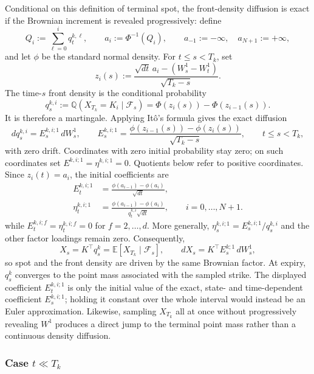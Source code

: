\documentclass[11pt]{article}
\newcommand{\Q}{\mathbb Q}
\theoremstyle{plain}
\theoremstyle{definition}
\theoremstyle{remark}
\begin{document}
Conditional on this definition of terminal spot, the front-density
diffusion is exact if the Brownian increment is revealed progressively:
define
\[
Q_i:=\sum_{\ell=0}^i q_t^{k,\ell},
\qquad
a_i:=\Phi^{-1}(Q_i),
\qquad
a_{-1}:=-\infty,\quad a_{N+1}:=+\infty,
\]
and let $\phi$ be the standard normal density. For $t\leq s<T_k$, set
\[
z_i(s):=
\frac{\sqrt{dt}\,a_i-(W_s^1-W_t^1)}{\sqrt{T_k-s}}.
\]
The time-$s$ front density is the conditional probability
\begin{equation}
q_s^{k,i}
:=\Q\!\left(X_{T_k}=K_i\mid\mathcal F_s\right)
=\Phi\!\left(z_i(s)\right)
-\Phi\!\left(z_{i-1}(s)\right).
\end{equation}
It is therefore a martingale. Applying It\^o's formula gives the exact
diffusion
\begin{equation}
dq_s^{k,i}=E_s^{k,i;1}\,dW_s^1,
\qquad
E_s^{k,i;1}
=\frac{\phi(z_{i-1}(s))-\phi(z_i(s))}{\sqrt{T_k-s}},
\qquad t\leq s<T_k,
\end{equation}
with zero drift. Coordinates with zero initial probability stay zero; on
such coordinates set $E^{k,i;1}=\eta^{k,i;1}=0$. Quotients below refer to
positive coordinates. Since $z_i(t)=a_i$, the initial coefficients are
\begin{equation}
\begin{aligned}
 E_t^{k,i;1}&=\frac{\phi(a_{i-1})-\phi(a_i)}{\sqrt{dt}},\\
 \eta_t^{k,i;1}&=\frac{\phi(a_{i-1})-\phi(a_i)}{q_t^{k,i}\sqrt{dt}},
 \qquad i=0,\ldots,N+1.
\end{aligned}
\end{equation}
while $E_t^{k,i;f}=\eta_t^{k,i;f}=0$ for $f=2,\ldots,d$.
More generally, $\eta_s^{k,i;1}=E_s^{k,i;1}/q_s^{k,i}$ and the other
factor loadings remain zero. Consequently,
\[
X_s=K^\top q_s^k
=\mathbb E\!\left[X_{T_k}\mid\mathcal F_s\right],
\qquad
dX_s=K^\top E_s^{k;1}\,dW_s^1,
\]
so spot and the front density are driven by the same Brownian factor. At
expiry, $q_s^k$ converges to the point mass associated with the sampled
strike. The displayed coefficient $E_t^{k,i;1}$ is only the initial value
of the exact, state- and time-dependent coefficient $E_s^{k,i;1}$; holding
it constant over the whole interval would instead be an Euler
approximation. Likewise, sampling $X_{T_k}$ all at once without
progressively revealing $W^1$ produces a direct jump to the terminal point
mass rather than a continuous density diffusion.

\subsubsection*{Case $t\ll T_k$}
\end{document}
